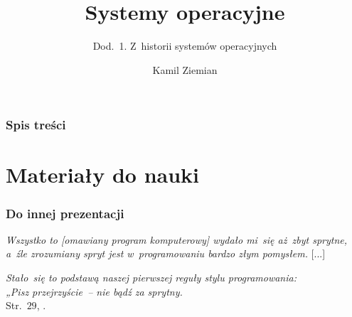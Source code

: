 \documentclass[10pt,t]{beamer}
\title{Systemy operacyjne}
\subtitle{Dod.~1. Z~historii systemów operacyjnych}
\author{Kamil Ziemian \\
  \email}
\begin{document}





\RaggedRight





\maketitle





\begin{frame}
  \frametitle{Spis treści}


  \tableofcontents

\end{frame}










\section{Materiały do nauki}


\begin{frame}
  \frametitle{Do innej prezentacji}

  \textit{Wszystko to [omawiany program komputerowy] wydało mi~się
    aż~zbyt sprytne, a~źle zrozumiany spryt jest w~programowaniu bardzo
    złym pomysłem.} [...]

  \textit{Stało~się to podstawą naszej pierwszej reguły stylu
    programowania:} \\
  \textit{„Pisz przejrzyście~-- nie bądź za sprytny.} \\[0.3em]
  Str.~$29$, \parencite{Kernighan-Jak-Unix-tworzyl-historie-Pub-2021}.

\end{frame}
\end{document}
